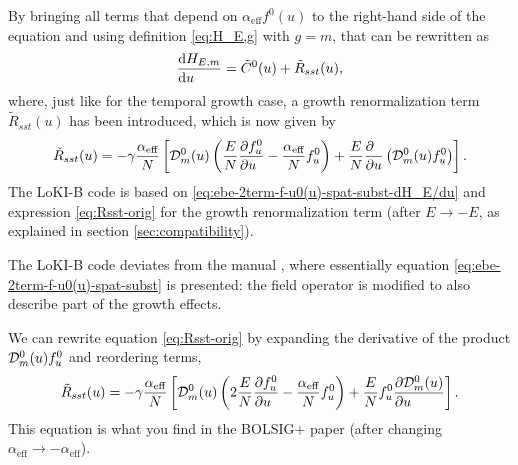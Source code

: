 \documentclass{book}
\begin{document}
By bringing all terms that depend on $\alpha_{\text{eff}}f^0(u)$ to the right-hand side
of the equation and using definition \eqref{eq:H_E,g} with $g=m$, that can be
rewritten as
\begin{equation}
	\DERIV{H_{E,m}}{u} = \tilde{C}^0(u) + \tilde{R}_{sst}(u),
	\label{eq:ebe-2term-f-u0(u)-spat-subst-dH_E/du}
\end{equation}
where, just like for the temporal growth case, a growth renormalization term $\tilde{R}_{sst}(u)$
has been introduced, which is now given by
\begin{equation}
	\tilde{R}_{sst}(u) =
	  -\gamma\frac{\alpha_{\text{eff}}}{N}\left[{\cal D}_m^0(u)\left(\frac{E}{N}\PDEV{f^0_u}{u}
        - \frac{\alpha_{\text{eff}}}{N}f^0_u\right)
	+ \frac{E}{N}\PDEV{}{u}\left({\cal D}_m^0(u)f^0_u\right)
	\right].
	\label{eq:Rsst-orig}
\end{equation}
The LoKI-B code is based on \eqref{eq:ebe-2term-f-u0(u)-spat-subst-dH_E/du} and
expression \eqref{eq:Rsst-orig} for the growth renormalization term (after
$E\rightarrow -E$, as explained in section \ref{sec:compatibility}).
\begin{framed}
  The LoKI-B code deviates from the manual \cite[eq. 8a--b,
  29--30c,32]{Manual_2_2_0}, where essentially equation
  \eqref{eq:ebe-2term-f-u0(u)-spat-subst} is presented: the field
  operator is modified to also describe part of the growth effects.
\end{framed}

We can rewrite equation \eqref{eq:Rsst-orig} by expanding the derivative of the
product ${\cal D}_m^0(u)f^0_u$ and reordering terms,
\begin{equation}
	\tilde{R}_{sst}(u)
	  =-\gamma\frac{\alpha_{\text{eff}}}{N}\left[{\cal D}_m^0(u)\left(2\frac{E}{N}\PDEV{f^0_u}{u}
        - \frac{\alpha_{\text{eff}}}{N}f^0_u\right)
	+ \frac{E}{N}f^0_u\PDEV{{\cal D}_m^0(u)}{u}
	\right].
	\label{eq:Rsst-alts}
\end{equation}
This equation is what you find in the BOLSIG+ paper \cite[eq. 19]{Hagelaar2005}
(after changing $\alpha_{\text{eff}}\rightarrow -\alpha_{\text{eff}}$).
\end{document}
